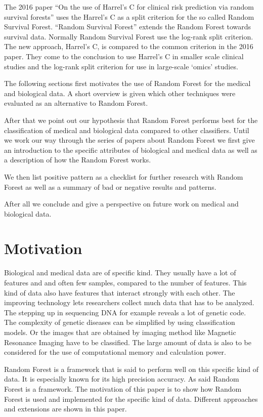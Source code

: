 \documentclass{sig-alternate-05-2015}
\begin{document}
The 2016 paper ``On the use of Harrel's C for clinical risk prediction via random survival forests'' \cite{Schmid2016450} uses the Harrel's C as a split criterion for the so called Random Survival Forest. ``Random Survival Forest'' \cite{ishwaran2008random} extends the Random Forest towards survival data. Normally Random Survival Forest use the log-rank split criterion. The new approach, Harrel's C, is compared to the common criterion in the 2016 paper. They come to the conclusion to use Harrel's C in smaller scale clinical studies and the log-rank split criterion for use in large-scale `omics' studies.

The following sections first motivates the use of Random Forest for the medical and biological data. A short overview is given which other techniques were evaluated as an alternative to Random Forest.

After that we point out our hypothesis that Random Forest performs best for the classification of medical and biological data compared to other classifiers. Until we work our way through the series of papers about Random Forest we first give an introduction to the specific attributes of biological and medical data as well as a description of how the Random Forest works.

We then list positive pattern as a checklist for further research with Random Forest as well as a summary of bad or negative results and patterns. 

After all we conclude and give a perspective on future work on medical and biological data.

\section{Motivation}
Biological and medical data are of specific kind. They usually have a lot of features and and often few samples, compared to the number of features. This kind of data also have features that interact strongly with each other. The improving technology lets researchers collect much data that has to be analyzed. The stepping up in sequencing DNA for example reveals a lot of genetic code. The complexity of genetic diseases can be simplified by using classification models. Or the images that are obtained by imaging method like Magnetic Resonance Imaging have to be classified. The large amount of data is also to be considered for the use of computational memory and calculation power.

Random Forest is a framework that is said to perform well on this specific kind of data. It is especially known for its high precision accuracy. As said Random Forest is a framework. The motivation of this paper is to show how Random Forest is used and implemented for the specific kind of data. Different approaches and extensions are shown in this paper.
\end{document}
